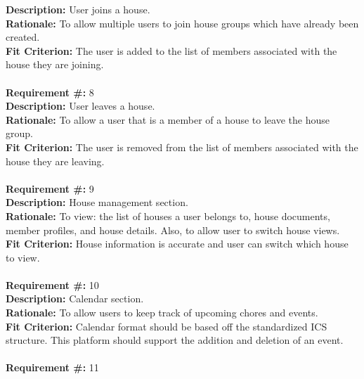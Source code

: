 \documentclass[12pt]{article}
\begin{document}
      \textbf{Description:} User joins a house. \\
      \textbf{Rationale:} To allow multiple users to join house groups which
      have already been created. \\
      \textbf{Fit Criterion:} The user is added to the list of members
      associated with the house they are joining. \\ \\
\textbf{Requirement \#:} 8
       \\
      \textbf{Description:} User leaves a house. \\
      \textbf{Rationale:} To allow a user that is a member of a house to leave the house group. \\
      \textbf{Fit Criterion:} The user is removed from the list of members
      associated with the house they are leaving. \\ \\
\textbf{Requirement \#:} 9
       \\
      \textbf{Description:} House management section. \\
      \textbf{Rationale:} To view: the list of houses a user belongs to, house documents, member profiles, and house details. Also, to allow user to switch house views.\\
      \textbf{Fit Criterion:} House information is accurate and user can switch which house to view. \\ \\
\textbf{Requirement \#:} 10
       \\
      \textbf{Description: }{Calendar section.} \\
      \textbf{Rationale: }{To allow users to keep track of upcoming chores and events.} \\
      \textbf{Fit Criterion: }{Calendar format should be based off the 
standardized ICS structure. This platform should support the addition and deletion of an event.} \\ \\
\textbf{Requirement \#:} 11
\end{document}
